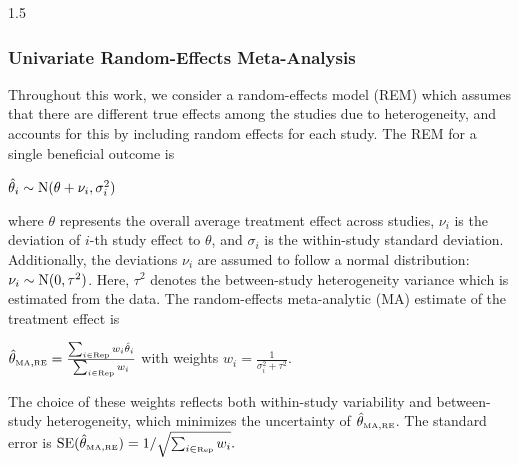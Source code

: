 \documentclass{article}
\begin{document}
\begin{spacing}{1.5}
\subsubsection{Univariate Random-Effects Meta-Analysis} \label{REM}
Throughout this work, we consider a random-effects model (REM) which assumes that there are different true effects among the studies due to heterogeneity, and accounts for this by including random effects for each study. The REM for a single beneficial outcome is
\begin{center}
$\hat\theta_i \sim \operatorname{N}(\theta + \nu_i, \sigma^{2}_i)$
\end{center}
where $\theta$ represents the overall average treatment effect across studies, $\nu_i$
is the deviation of $i$-th study effect to $\theta$, and $\sigma_i$ is the within-study standard deviation. Additionally, the deviations $\nu_i$ are assumed to follow a normal distribution:
$\nu_i \sim \operatorname{N}(0, \tau^2)$.
Here, $\tau^2$ denotes the between-study heterogeneity variance which is estimated from the data. The random-effects meta-analytic (MA) estimate of the treatment effect is 
\begin{center}
$\hat\theta_{\tiny{\mbox{MA}}, \mbox{\tiny{RE}}} = \frac{\sum_{i \in \mbox{\tiny{Rep}}} w_i \hat \theta_i}{\sum_{i \in \mbox{\tiny{Rep}}} w_i}$ with weights $w_i = \frac{1}{\sigma^{2}_i + \tau^2}$.
\end{center}

The choice of these weights reflects both within-study variability and between-study heterogeneity, which minimizes the uncertainty of $\hat\theta_{\tiny{\mbox{MA}}, \mbox{\tiny{RE}}}$.  The standard error is $\mbox{{SE}}(\hat\theta_{\tiny{\mbox{MA}}, \mbox{\tiny{RE}}}) = 1/{\sqrt{\sum_{i \in \mbox{\tiny{Rep}}} w_i}}.$ 


\end{spacing}
\end{document}
